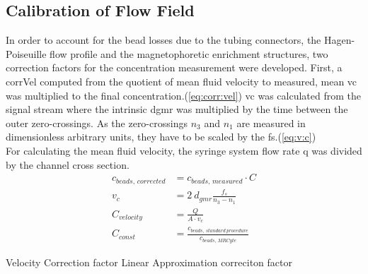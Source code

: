 \clearpage
\subsection{Calibration of Flow Field}
\label{sec:res:Correction}
In order to account for the bead losses due to the tubing connectors, the Hagen-Poiseuille flow profile and the magnetophoretic enrichment structures, two correction factors for the concentration measurement were developed. First, a \gls{corrVel} computed from the quotient of mean fluid velocity to measured, mean \gls{vc} was multiplied to the final concentration.(\cref{eq:corr:vel}) \gls{vc} was calculated from the signal stream where the intrinsic \acrfull{dgmr} was multiplied by the time between the outer zero-crossings. As the zero-crossings $n_3$ and $n_1$ are measured in dimensionless arbitrary units, they have to be scaled by the \acrfull{fs}.(\cref{eq:v:c}) \\ For calculating the mean fluid velocity, the syringe system flow rate \gls{q} was divided by the channel cross section. \\

\begin{align}
	c_{beads,\, corrected} &= c_{beads,\, measured}  \cdot C \\
	v_c &= 2\ d_{gmr} \frac{f_s}{n_3-n_1} \label{eq:v:c} \\
	C_{velocity} &= \frac{Q}{A \cdot v_c} \label{eq:corr:vel} \\
	C_{const} &= \frac{c_{beads,\, standard\ procedure}}{c_{beads,\, MRCyte}} \label{eq:corr:const}
\end{align}

Velocity Correction factor
Linear Approximation correciton factor



\begin{figure}
	\centering
	 \hfill
	\label{fig:conc:AbsConcError}
\end{figure}

